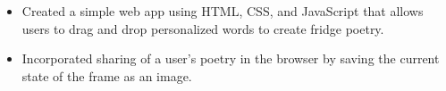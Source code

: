 \begin{itemize}
  \item Created a simple web app using HTML, CSS, and JavaScript that allows users to drag and drop personalized words to create fridge poetry.
  \item Incorporated sharing of a user's poetry in the browser by saving the current state of the frame as an image.
\end{itemize}





